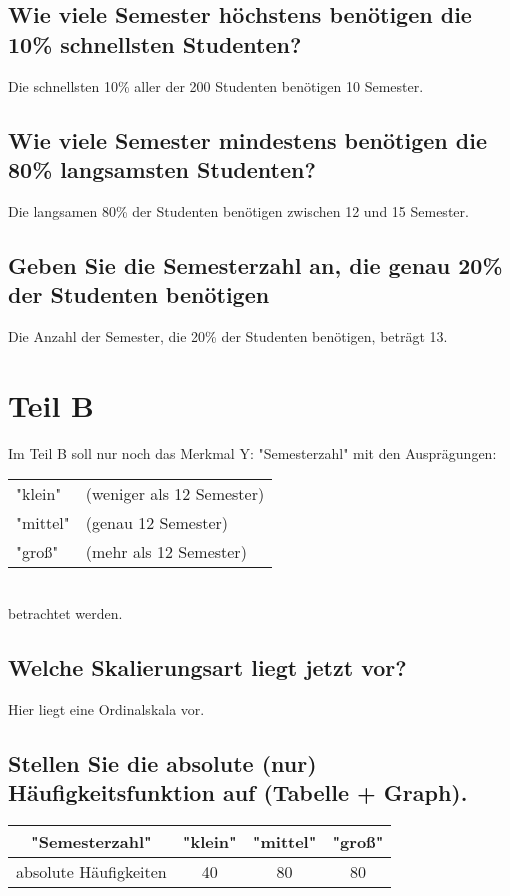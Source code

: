\documentclass{article}
\begin{document}
\subsection{Wie viele Semester höchstens benötigen die 10\% schnellsten Studenten?}
Die schnellsten 10\% aller der 200 Studenten benötigen 10 Semester.

\subsection{Wie viele Semester mindestens benötigen die 80\% langsamsten Studenten?}
Die langsamen 80\% der Studenten benötigen zwischen 12 und 15 Semester.

\subsection{Geben Sie die Semesterzahl an, die genau 20\% der Studenten benötigen}
Die Anzahl der Semester, die 20\% der Studenten benötigen, beträgt 13.

\section{Teil B}
Im Teil B soll nur noch das Merkmal Y: "Semesterzahl" mit den Ausprägungen:

\begin{tabular}{ l l  } 
"klein" & (weniger als 12 Semester)\\
"mittel" & (genau 12 Semester)\\
"groß" & (mehr als 12 Semester)
\end{tabular}\\
betrachtet werden.

\subsection{Welche Skalierungsart liegt jetzt vor?}
Hier liegt eine Ordinalskala vor.

\subsection{Stellen Sie die absolute (nur) Häufigkeitsfunktion auf (Tabelle + Graph).}
\begin{center}
\begin{tabular}{| c | c | c | c | } 
\hline
"Semesterzahl" & "klein" & "mittel" & "groß" \\ 
\hline
absolute Häufigkeiten & 40 & 80 & 80 \\ 
\hline
\end{tabular}
\end{center}
\end{document}
